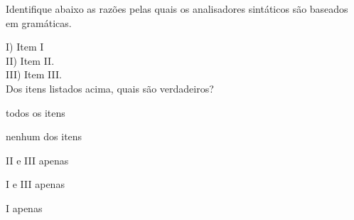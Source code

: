 \question[10]

Identifique abaixo as razões pelas quais os analisadores sintáticos são
baseados em gramáticas.

I) Item I\\
II) Item II.\\
III) Item III.\\

Dos itens listados acima, quais são verdadeiros?\\

\begin{choices}
\item todos os itens %
\item nenhum dos itens
\item II e III apenas
\item I e III apenas
\item I apenas
\end{choices}
\answerline


